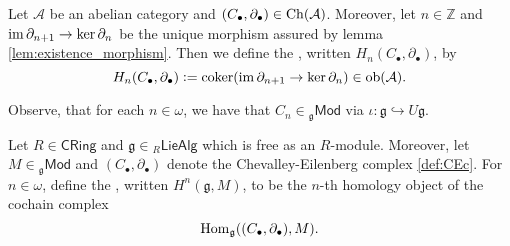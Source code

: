 \begin{definition}
	Let $\mathcal{A}$ be an abelian category and $(C_\bullet,\partial_\bullet) \in \operatorname{Ch}(\mathcal{A})$. Moreover, let $n \in \mathbb{Z}$ and $\operatorname{im} \partial_{n + 1} \to \ker \partial_n$ be the unique morphism assured by lemma \ref{lem:existence_morphism}. Then we define the , written $H_n(C_\bullet,\partial_\bullet)$, by
	\begin{equation*}
		H_n(C_\bullet,\partial_\bullet) := \operatorname{coker}(\operatorname{im} \partial_{n + 1} \to \ker \partial_n) \in \operatorname{ob}(\mathcal{A}).
	\end{equation*} 
\end{definition}

Observe, that for each $n \in \omega$, we have that $C_n \in {_{\mathfrak{g}}}\mathsf{Mod}$ via $\iota : \mathfrak{g} \hookrightarrow U\mathfrak{g}$.

\begin{definition}
	Let $R \in \mathsf{CRing}$ and $\mathfrak{g} \in {_{R}}\mathsf{LieAlg}$ which is free as an $R$-module. Moreover, let $M \in {_{\mathfrak{g}}}\mathsf{Mod}$ and $(C_\bullet,\partial_\bullet)$ denote the Chevalley-Eilenberg complex \ref{def:CEc}. For $n \in \omega$, define the , written $H^n(\mathfrak{g},M)$, to be the $n$-th homology object of the cochain complex 
	\begin{equation*}
		\operatorname{Hom}_\mathfrak{g}((C_\bullet,\partial_\bullet),M).
	\end{equation*}
\end{definition}

